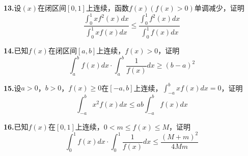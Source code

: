 \documentclass[10pt]{article}
\begin{document}
\textbf{13.}设$\left( x \right)$在闭区间$\left[ 0,1 \right]$上连续，函数$f\left( x \right) \left( f\left( x \right) >0 \right)$单调减少，证明
$$
\frac{\int_0^1{xf^2\left( x \right) dx}}{\int_0^1{xf\left( x \right) dx}}\le \frac{\int_0^1{f^2\left( x \right) dx}}{\int_0^1{f\left( x \right) dx}}
$$

\textbf{14.}已知$f\left( x \right)$在闭区间$\left[ a,b \right]$上连续，$f\left( x \right) >0$，证明
$$
\int_a^b{f\left( x \right) dx}\cdot \int_a^b{\frac{1}{f\left( x \right)}dx}\ge \left( b-a \right) ^2
$$

\textbf{15.}设$a>0$，$b>0$，$f\left( x \right) \ge 0$在$\left[ -a,b \right]$上连续，$\int_{-a}^b{xf\left( x \right) dx}=0$，证明
$$
\int_{-a}^b{x^2f\left( x \right) dx}\le ab\int_{-a}^b{f\left( x \right) dx}
$$

\textbf{16.}已知$f\left( x \right)$在$\left[ 0,1 \right]$上连续，$0<m\le f\left( x \right) \le M$，证明
$$
\int_0^1{f\left( x \right) dx}\cdot \int_0^1{\frac{1}{f\left( x \right)}dx}\le \frac{\left( M+m \right) ^2}{4Mm}
$$
\end{document}
